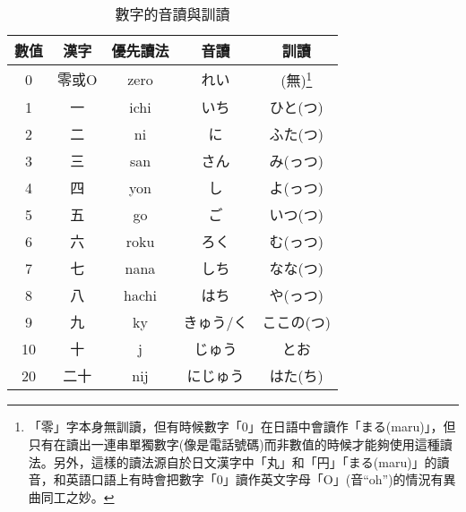 \documentclass[12pt]{article}
\begin{document}
\begin{CJK}{UTF8}{cwku}
\begin{longtable}{ccccc}
\caption{數字的音讀與訓讀}\\
數值 & 	漢字 &	優先讀法 & 音讀 & 訓讀\\
\hline
\begin{comment}
\end{comment}
0 &	零或O & zero &	れい &	(無)\footnote{「零」字本身無訓讀，但有時候數字「0」在日語中會讀作「まる(maru)」，但只有在讀出一連串單獨數字(像是電話號碼)而非數值的時候才能夠使用這種讀法。另外，這樣的讀法源自於日文漢字中「丸」和「円」「まる(maru)」的讀音，和英語口語上有時會把數字「0」讀作英文字母「O」(音``oh'')的情況有異曲同工之妙。} \\
\hline
1 &	一 &	ichi &	いち  &	ひと(つ)\\
\hline
2 &	二 &	ni &	に &	ふた(つ)\\
\hline
3 &	三 &	san &	さん &	み(っつ)\\
\hline
4 &	四 &	yon &	し &	よ(っつ)\\
\hline
5 &	五 &	go &	ご &	いつ(つ)\\
\hline
6 &	六 &	roku &	ろく  &	む(っつ)\\
\hline
7 &	七 &	nana &	しち  &	なな(つ)\\
\hline
8 &	八 &	hachi &	はち  &	や(っつ)\\
\hline
9 &	九 &	ky &	きゅう/く   &	ここの(つ)\\
\hline
10 &	十 &	j &	じゅう &	とお\\
\hline
20 &	二十 &	nij &	にじゅう &	はた(ち)\\
\hline

\end{longtable}





\end{CJK}
\end{document}
